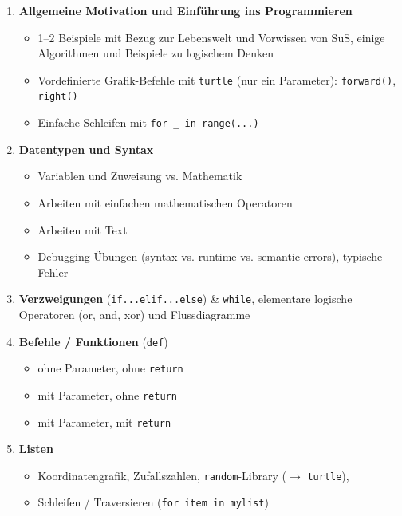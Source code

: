 \begin{myoverview}
	\phantom{1}
	\begin{enumerate}
		\item \textbf{Allgemeine Motivation und Einführung ins Programmieren}
		      \begin{itemize}
			      \item 1--2 Beispiele mit Bezug zur Lebenswelt und Vorwissen von SuS, einige Algorithmen und Beispiele zu logischem Denken
			      \item Vordefinierte Grafik-Befehle mit \lstinline|turtle| (nur ein Parameter): \lstinline|forward()|, \lstinline|right()|
			      \item Einfache Schleifen mit \lstinline|for _ in range(...)|
		      \end{itemize}
		\item \textbf{Datentypen und Syntax}
		      \begin{itemize}
			      \item Variablen und Zuweisung vs. Mathematik
			      \item Arbeiten mit einfachen mathematischen Operatoren
			      \item Arbeiten mit Text
			      \item Debugging-Übungen (syntax vs. runtime vs. semantic errors), typische Fehler
		      \end{itemize}
		\item \textbf{Verzweigungen} (\lstinline|if...elif...else|) \& \lstinline|while|,  elementare logische Operatoren (or, and, xor)  und Flussdiagramme
		\item \textbf{Befehle / Funktionen} (\lstinline|def|)
		      \begin{itemize}
			      \item ohne Parameter, ohne \lstinline|return|
			      \item mit Parameter, ohne \lstinline|return|
			      \item mit Parameter, mit \lstinline|return|
		      \end{itemize}
		\item \textbf{Listen}
		      \begin{itemize}
			      \item  Koordinatengrafik, Zufallszahlen, \lstinline|random|-Library ($\rightarrow$ \lstinline|turtle|), \item Schleifen / Traversieren (\lstinline|for item in mylist|)
		      \end{itemize}
	\end{enumerate}
\end{myoverview}


